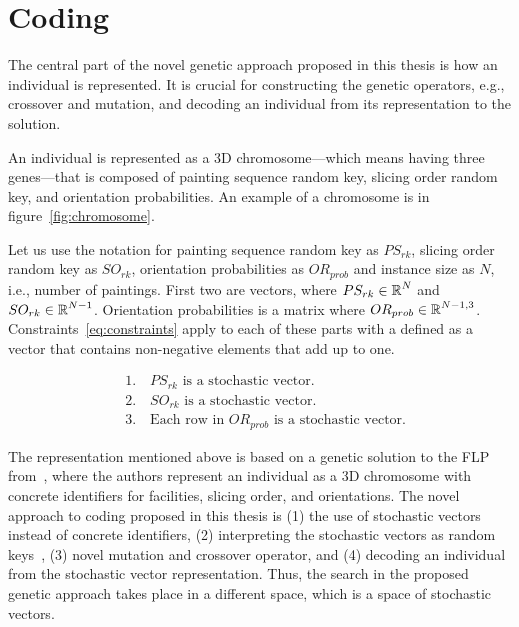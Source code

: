 \newpage
\section{Coding}\label{sec:coding}

The central part of the novel genetic approach proposed in this thesis is how an individual is represented.
It is crucial for constructing the genetic operators, e.g., crossover and mutation, and decoding an individual from its representation to the solution.

An individual is represented as a 3D chromosome—which means having three genes—that is composed of
painting sequence random key, slicing order random key, and orientation probabilities.
An example of a chromosome is in figure~\ref{fig:chromosome}.

Let us use the notation for painting sequence random key as $PS_{rk}$,
slicing order random key as $SO_{rk}$,
orientation probabilities as $OR_{prob}$ and instance size as $N$, i.e., number of paintings.
First two are vectors, where $PS_{rk} \in \operatorname*{\mathbb{R}}^N$ and $SO_{rk} \in \operatorname*{\mathbb{R}}^{N-1}$.
Orientation probabilities is a matrix where $OR_{prob} \in \operatorname*{\mathbb{R}}^{N-1, 3}$.
Constraints~\ref{eq:constraints} apply to each of these parts with
a  defined as a vector that contains non-negative elements that add up to one.

\begin{equation}
    \begin{aligned}
        & 1. \quad PS_{rk} \text{ is a stochastic vector.} \\
        & 2. \quad SO_{rk} \text{ is a stochastic vector.} \\
        & 3. \quad \text{Each row in } OR_{prob} \text{ is a stochastic vector.}
    \end{aligned}\label{eq:constraints}
\end{equation}


The representation mentioned above is based on a genetic solution to the FLP
from~\cite{friedrichIntegratedSlicingTree2018, riponAdaptiveVariableNeighborhood2013},
where the authors represent an individual as a 3D chromosome with concrete identifiers for facilities, slicing order, and orientations.
The novel approach to coding proposed in this thesis is
(1) the use of stochastic vectors instead of concrete identifiers,
(2) interpreting the stochastic vectors as random keys~\cite{beanGeneticAlgorithmsRandom1994},
(3) novel mutation and crossover operator, and
(4) decoding an individual from the stochastic vector representation.
Thus, the search in the proposed genetic approach takes place in a different space, which is a space of stochastic vectors.

